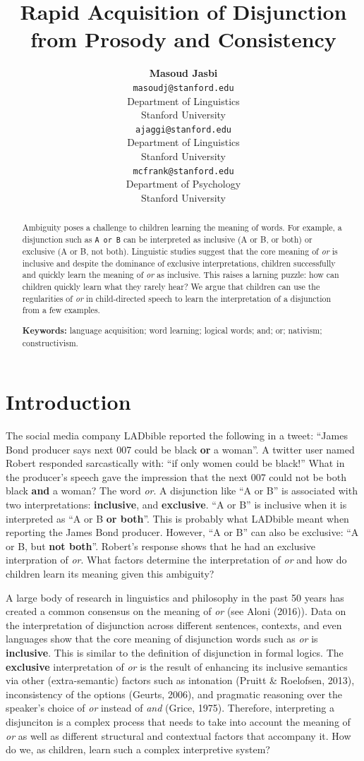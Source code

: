 \documentclass[10pt, letterpaper]{article}
\title{Rapid Acquisition of Disjunction from Prosody and Consistency}
\author{{\large \bf Masoud Jasbi} \\ \texttt{masoudj@stanford.edu} \\ Department of Linguistics \\ Stanford University \And {\large \bf Akshay Jaggi} \\ \texttt{ajaggi@stanford.edu} \\ Department of Linguistics \\ Stanford University \And {\large \bf Michael C. Frank} \\ \texttt{mcfrank@stanford.edu} \\ Department of Psychology \\ Stanford University }
\begin{document}
\maketitle

\begin{abstract}
Ambiguity poses a challenge to children learning the meaning of words.
For example, a disjunction such as \texttt{A\ or\ B} can be interpreted
as inclusive (A or B, or both) or exclusive (A or B, not both).
Linguistic studies suggest that the core meaning of \emph{or} is
inclusive and despite the dominance of exclusive interpretations,
children successfully and quickly learn the meaning of \emph{or} as
inclusive. This raises a larning puzzle: how can children quickly learn
what they rarely hear? We argue that children can use the regularities
of \emph{or} in child-directed speech to learn the interpretation of a
disjunction from a few examples.

\textbf{Keywords:}
language acquisition; word learning; logical words; and; or; nativism;
constructivism.
\end{abstract}

\section{Introduction}\label{introduction}

The social media company LADbible reported the following in a tweet:
``James Bond producer says next 007 could be black \textbf{or} a
woman''. A twitter user named Robert responded sarcastically with: ``if
only women could be black!'' What in the producer's speech gave the
impression that the next 007 could not be both black \textbf{and} a
woman? The word \emph{or}. A disjunction like ``A or B'' is associated
with two interpretations: \textbf{inclusive}, and \textbf{exclusive}.
``A or B'' is inclusive when it is interpreted as ``A or B \textbf{or
both}''. This is probably what LADbible meant when reporting the James
Bond producer. However, ``A or B'' can also be exclusive: ``A or B, but
\textbf{not both}''. Robert's response shows that he had an exclusive
interpration of \emph{or}. What factors determine the interpretation of
\emph{or} and how do children learn its meaning given this ambiguity?

A large body of research in linguistics and philosophy in the past 50
years has created a common consensus on the meaning of \emph{or} (see
Aloni (2016)). Data on the interpretation of disjunction across
different sentences, contexts, and even languages show that the core
meaning of disjunction words such as \emph{or} is \textbf{inclusive}.
This is similar to the definition of disjunction in formal logics. The
\textbf{exclusive} interpretation of \emph{or} is the result of
enhancing its inclusive semantics via other (extra-semantic) factors
such as intonation (Pruitt \& Roelofsen, 2013), inconsistency of the
options (Geurts, 2006), and pragmatic reasoning over the speaker's
choice of \emph{or} instead of \emph{and} (Grice, 1975). Therefore,
interpreting a disjunciton is a complex process that needs to take into
account the meaning of \emph{or} as well as different structural and
contextual factors that accompany it. How do we, as children, learn such
a complex interpretive system?
\end{document}
